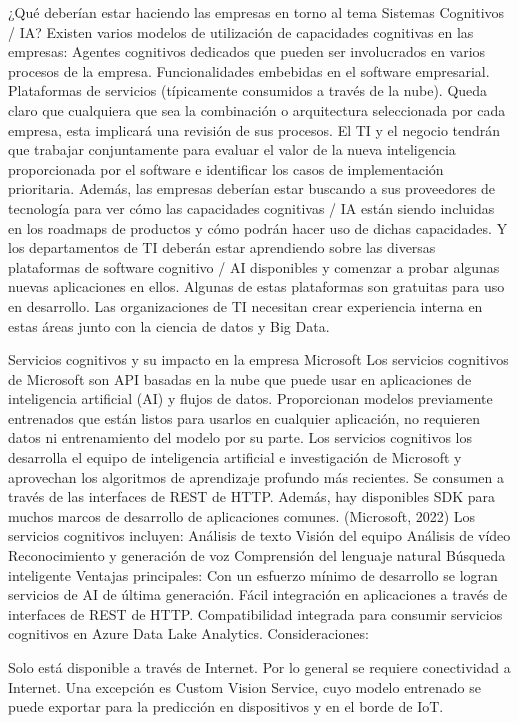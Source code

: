 ¿Qué deberían estar haciendo las empresas en torno al tema Sistemas Cognitivos / IA?
Existen varios modelos de utilización de capacidades cognitivas en las empresas:
Agentes cognitivos dedicados que pueden ser involucrados en varios procesos de la empresa.
Funcionalidades embebidas en el software empresarial.
Plataformas de servicios (típicamente consumidos a través de la nube).
Queda claro que cualquiera que sea la combinación o arquitectura seleccionada por cada empresa, esta implicará una revisión de sus procesos. El TI y el negocio tendrán que trabajar conjuntamente para evaluar el valor de la nueva inteligencia proporcionada por el software e identificar los casos de implementación prioritaria. Además, las empresas deberían estar buscando a sus proveedores de tecnología para ver cómo las capacidades cognitivas / IA están siendo incluidas en los roadmaps de productos y cómo podrán hacer uso de dichas capacidades. Y los departamentos de TI deberán estar aprendiendo sobre las diversas plataformas de software cognitivo / AI disponibles y comenzar a probar algunas nuevas aplicaciones en ellos. Algunas de estas plataformas son gratuitas para uso en desarrollo. Las organizaciones de TI necesitan crear experiencia interna en estas áreas junto con la ciencia de datos y Big Data.

Servicios cognitivos y su impacto en la empresa Microsoft
Los servicios cognitivos de Microsoft son API basadas en la nube que puede usar en aplicaciones de inteligencia artificial (AI) y flujos de datos. Proporcionan modelos previamente entrenados que están listos para usarlos en cualquier aplicación, no requieren datos ni entrenamiento del modelo por su parte. Los servicios cognitivos los desarrolla el equipo de inteligencia artificial e investigación de Microsoft y aprovechan los algoritmos de aprendizaje profundo más recientes. Se consumen a través de las interfaces de REST de HTTP. Además, hay disponibles SDK para muchos marcos de desarrollo de aplicaciones comunes. (Microsoft, 2022)
Los servicios cognitivos incluyen:
Análisis de texto
Visión del equipo
Análisis de vídeo
Reconocimiento y generación de voz
Comprensión del lenguaje natural
Búsqueda inteligente
Ventajas principales:
Con un esfuerzo mínimo de desarrollo se logran servicios de AI de última generación.
Fácil integración en aplicaciones a través de interfaces de REST de HTTP.
Compatibilidad integrada para consumir servicios cognitivos en Azure Data Lake Analytics.
Consideraciones:

Solo está disponible a través de Internet. Por lo general se requiere conectividad a Internet. Una excepción es Custom Vision Service, cuyo modelo entrenado se puede exportar para la predicción en dispositivos y en el borde de IoT.

